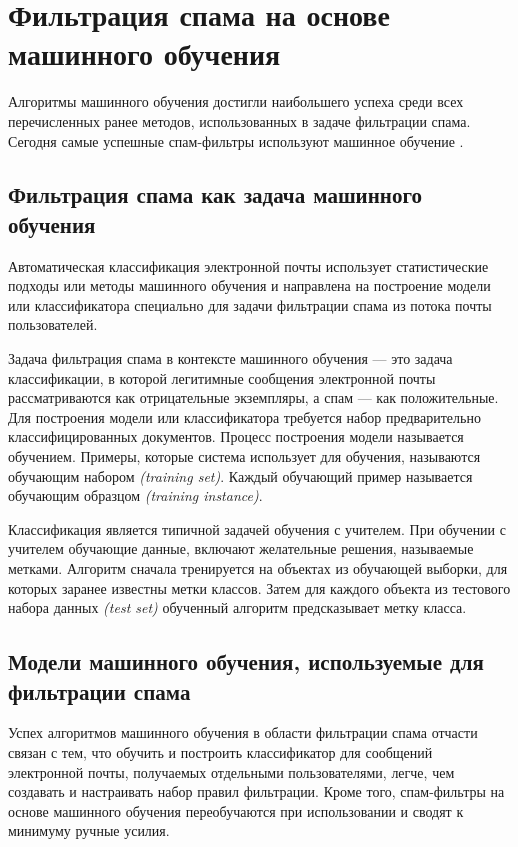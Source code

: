 \section{Фильтрация спама на основе машинного обучения}\label{Section:ML}
Алгоритмы машинного обучения достигли наибольшего успеха среди всех
перечисленных ранее методов, использованных в задаче фильтрации спама.
Сегодня самые успешные спам-фильтры используют машинное обучение \cite{filters}.

\subsection{Фильтрация спама как задача машинного обучения}
Автоматическая классификация электронной почты использует статистические подходы
или методы машинного обучения и направлена ​​на построение модели или классификатора
специально для задачи фильтрации спама из потока почты пользователей.

Задача фильтрация спама в контексте машинного обучения — это задача классификации,
в которой легитимные сообщения электронной почты рассматриваются как отрицательные
экземпляры, а спам — как положительные. Для построения модели или классификатора
требуется набор предварительно классифицированных документов. Процесс построения
модели называется обучением. Примеры, которые система использует для обучения,
называются обучающим набором \emph{(training set)}. Каждый обучающий при­мер называется
обучающим образцом \emph{(training instance)}.

Классификация является типичной задачей обучения с учителем. При обучении с учителем
обучающие данные, включают желательные решения, называемые метками. Алгоритм сначала
тренируется на объектах из обучающей выборки, для которых заранее известны метки классов.
Затем для каждого объекта из тестового набора данных \emph{(test set)} обученный алгоритм
предсказывает метку класса.

\subsection{Модели машинного обучения, используемые для фильтрации спама}\label{ML}

Успех алгоритмов машинного обучения в области фильтрации спама отчасти связан с тем, что
обучить и построить классификатор для сообщений электронной почты, получаемых отдельными
пользователями, легче,  чем создавать и настраивать набор правил фильтрации. Кроме того,
спам-фильтры на основе машинного обучения переобучаются при использовании и сводят к
минимуму ручные усилия.


